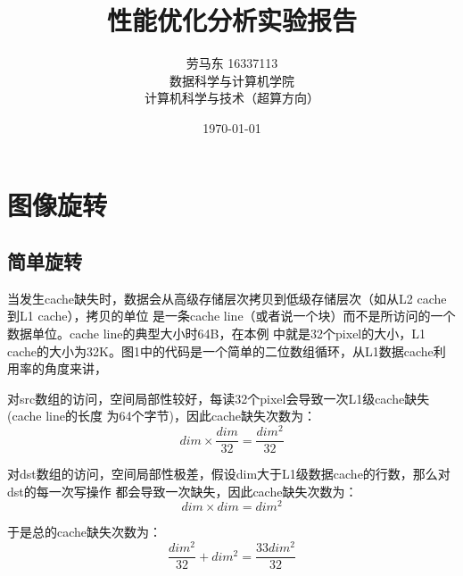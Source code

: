 \documentclass[12pt]{article}
\title{性能优化分析实验报告} %
\author{劳马东 \textsc{16337113}\\数据科学与计算机学院\\计算机科学与技术（超算方向）} %
\date{\today} %
\begin{document}
\maketitle %



\section{图像旋转}
\subsection{简单旋转}
当发生cache缺失时，数据会从高级存储层次拷贝到低级存储层次（如从L2 cache到L1 cache），拷贝的单位
是一条cache line（或者说一个块）而不是所访问的一个数据单位。cache line的典型大小时64B，在本例
中就是32个pixel的大小，L1 cache的大小为32K。图1中的代码是一个简单的二位数组循环，从L1数据cache利用率的角度来讲，
\begin{enumerate}
  \begin{item}
    对src数组的访问，空间局部性较好，每读32个pixel会导致一次L1级cache缺失(cache line的长度
    为64个字节)，因此cache缺失次数为：
    \begin{equation}
      dim \times \frac{dim}{32} = \frac{dim^2}{32}
    \end{equation}
  \end{item}
  \begin{item}
    对dst数组的访问，空间局部性极差，假设dim大于L1级数据cache的行数，那么对dst的每一次写操作
    都会导致一次缺失，因此cache缺失次数为：
    \begin{equation}
      dim \times dim = dim^2
    \end{equation}
  \end{item}
\end{enumerate}
于是总的cache缺失次数为：
\begin{equation}
  \frac{dim^2}{32} + dim^2 = \frac{33dim^2}{32}
\end{equation}
\end{document}
